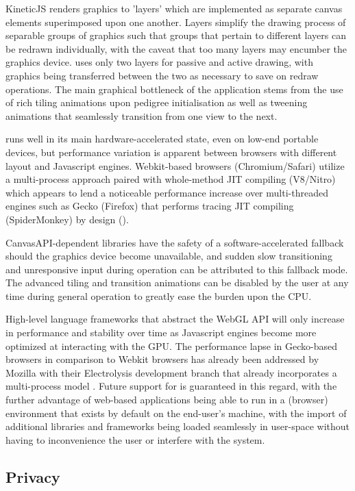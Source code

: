 KineticJS renders graphics to 'layers' which are implemented as separate canvas elements superimposed upon one another. Layers simplify the drawing process of separable groups of graphics such that groups that pertain to different layers can be redrawn individually, with the caveat that too many layers may encumber the graphics device. \app uses only two layers for passive and active drawing, with graphics being transferred between the two as necessary to save on redraw operations. The main graphical bottleneck of the application stems from the use of rich tiling animations upon pedigree initialisation as well as tweening animations that seamlessly transition from one view to the next.

\app runs well in its main hardware-accelerated state, even on low-end portable devices, but performance variation is apparent between browsers with different layout and Javascript engines. Webkit-based browsers (Chromium/Safari) utilize a multi-process approach paired with whole-method JIT compiling (V8/Nitro) which appears to lend a noticeable performance increase over multi-threaded engines such as Gecko (Firefox) that performs tracing JIT compiling (SpiderMonkey) by design (\citeauthor{v8,spidermonkey}). 

CanvasAPI-dependent libraries have the safety of a software-accelerated fallback should the graphics device become unavailable, and sudden slow transitioning and unresponsive input during \app operation can be attributed to this fallback mode. The advanced tiling and transition animations can be disabled by the user at any time during general operation to greatly ease the burden upon the CPU.

High-level language frameworks that abstract the WebGL API will only increase in performance and stability over time as Javascript engines become more optimized at interacting with the GPU. The performance lapse in Gecko-based browsers in comparison to Webkit browsers has already been addressed by Mozilla with their Electrolysis development branch that already incorporates a multi-process model \citep{firemulti}. Future support for \app is guaranteed in this regard, with the further advantage of web-based applications being able to run in a (browser) environment that exists by default on the end-user's machine, with the import of additional libraries and frameworks being loaded seamlessly in user-space without having to inconvenience the user or interfere with the system.



\subsection{Privacy}

